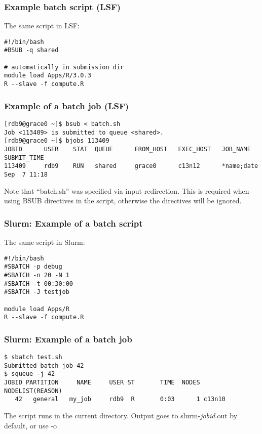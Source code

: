 \documentclass[10pt]{beamer}
\newcommand\smallfont{\fontsize{8pt}{7.2}\selectfont}
\newcommand\regfont{\fontsize{10pt}{7.2}\selectfont}
\begin{document}
\begin{frame}[fragile]
\frametitle{Example batch script (LSF)}
The same script in LSF:

\begin{block}{}
\begin{verbatim}
#!/bin/bash
#BSUB -q shared

# automatically in submission dir
module load Apps/R/3.0.3
R --slave -f compute.R
\end{verbatim}
\end{block}
\end{frame}

\begin{frame}[fragile]
\frametitle{Example of a batch job (LSF)}
\smallfont
\begin{verbatim}
[rdb9@grace0 ~]$ bsub < batch.sh
Job <113409> is submitted to queue <shared>.
[rdb9@grace0 ~]$ bjobs 113409
JOBID      USER    STAT  QUEUE      FROM_HOST   EXEC_HOST   JOB_NAME   SUBMIT_TIME
113409     rdb9    RUN   shared     grace0      c13n12      *name;date Sep  7 11:18
\end{verbatim}

\regfont
\vskip14pt
Note that ``batch.sh'' was specified via input redirection.
This is required when using BSUB directives in the script,
otherwise the directives will be ignored.
\end{frame}

\begin{frame}[fragile]
\frametitle{Slurm: Example of a batch script}
The same script in Slurm:

\begin{block}{}
\begin{verbatim}
#!/bin/bash
#SBATCH -p debug 
#SBATCH -n 20 -N 1
#SBATCH -t 00:30:00  
#SBATCH -J testjob

module load Apps/R
R --slave -f compute.R
\end{verbatim}
\end{block}{}
\end{frame}

\begin{frame}[fragile]
\frametitle{Slurm: Example of a batch job}
\smallfont
\begin{verbatim}
$ sbatch test.sh
Submitted batch job 42
$ squeue -j 42
JOBID PARTITION     NAME     USER ST       TIME  NODES NODELIST(REASON)
   42   general   my_job     rdb9  R       0:03      1 c13n10
\end{verbatim}
\vskip14pt
\regfont
The script runs in the current directory.  
Output goes to slurm-\textit{jobid}.out by default, or use -o
\end{frame}
\end{document}
